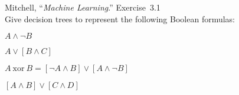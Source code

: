\begin{problem}
  Mitchell, ``\textit{Machine Learning}.'' Exercise~3.1\\
  \textnormal{Give decision trees to represent the following Boolean formulas:}
\end{problem}

\begin{subproblem}
  $A \wedge \lnot B$
\end{subproblem}



\begin{subproblem}
  $A \vee [B \wedge C] $
\end{subproblem}



\begin{subproblem}
  $A~\text{xor}~B =  [\lnot A \wedge B] \vee [A \wedge \lnot B]$
\end{subproblem}



\begin{subproblem}
  $[A \wedge B] \vee [C \wedge D]$
\end{subproblem}


